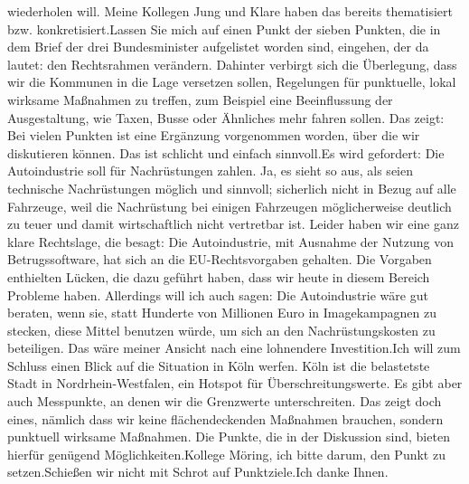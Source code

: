 \documentclass{article}
\begin{document}
wiederholen will. Meine Kollegen Jung und Klare haben das bereits thematisiert bzw. konkretisiert.Lassen Sie mich auf einen Punkt der sieben Punkten, die in dem Brief der drei Bundesminister aufgelistet worden sind, eingehen, der da lautet: den Rechtsrahmen verändern. Dahinter verbirgt sich die Überlegung, dass wir die Kommunen in die Lage versetzen sollen, Regelungen für punktuelle, lokal wirksame Maßnahmen zu treffen, zum Beispiel eine Beeinflussung der Ausgestaltung, wie Taxen, Busse oder Ähnliches mehr fahren sollen. Das zeigt: Bei vielen Punkten ist eine Ergänzung vorgenommen worden, über die wir diskutieren können. Das ist schlicht und einfach sinnvoll.Es wird gefordert: Die Autoindustrie soll für Nachrüstungen zahlen. Ja, es sieht so aus, als seien technische Nachrüstungen möglich und sinnvoll; sicherlich nicht in Bezug auf alle Fahrzeuge, weil die Nachrüstung bei einigen Fahrzeugen möglicherweise deutlich zu teuer und damit wirtschaftlich nicht vertretbar ist. Leider haben wir eine ganz klare Rechtslage, die besagt: Die Autoindus­trie, mit Ausnahme der Nutzung von Betrugssoftware, hat sich an die EU-Rechtsvorgaben gehalten. Die Vorgaben enthielten Lücken, die dazu geführt haben, dass wir heute in diesem Bereich Probleme haben. Allerdings will ich auch sagen: Die Autoindustrie wäre gut beraten, wenn sie, statt Hunderte von Millionen Euro in Imagekampagnen zu stecken, diese Mittel benutzen würde, um sich an den Nachrüstungskosten zu beteiligen. Das wäre meiner Ansicht nach eine lohnendere Investition.Ich will zum Schluss einen Blick auf die Situation in Köln werfen. Köln ist die belastetste Stadt in Nordrhein-Westfalen, ein Hotspot für Überschreitungswerte. Es gibt aber auch Messpunkte, an denen wir die Grenzwerte unterschreiten. Das zeigt doch eines, nämlich dass wir keine flächendeckenden Maßnahmen brauchen, sondern punktuell wirksame Maßnahmen. Die Punkte, die in der Diskussion sind, bieten hierfür genügend Möglichkeiten.Kollege Möring, ich bitte darum, den Punkt zu setzen.Schießen wir nicht mit Schrot auf Punktziele.Ich danke Ihnen.
\end{document}
